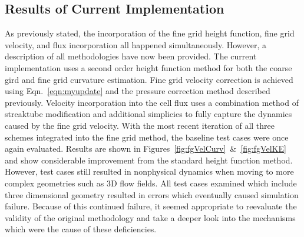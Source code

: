 \subsection{Results of Current Implementation}
As previously stated, the incorporation of the fine grid height function, fine grid velocity, and flux incorporation all happened simultaneously. However, a description of all methodologies have now been provided. The current implementation uses a second order height function method for both the coarse gird and fine grid curvature estimation. Fine grid velocity correction is achieved using Eqn.~\ref{eqn:myupdate} and the pressure correction method described previously. Velocity incorporation into the cell flux uses a combination method of streaktube modification and additional simplicies to fully capture the dynamics caused by the fine grid velocity. With the most recent iteration of all three schemes integrated into the fine grid method, the baseline test cases were once again evaluated. Results are shown in Figures~\ref{fig:fgVelCurv}~\&~\ref{fig:fgVelKE} and show considerable improvement from the standard height function method. However, test cases still resulted in nonphysical dynamics when moving to more complex geometries such as 3D flow fields. All test cases examined which include three dimensional geometry resulted in errors which eventually caused simulation failure. Because of this continued failure, it seemed appropriate to reevaluate the validity of the original methodology and take a deeper look into the mechanisms which were the cause of these deficiencies.
